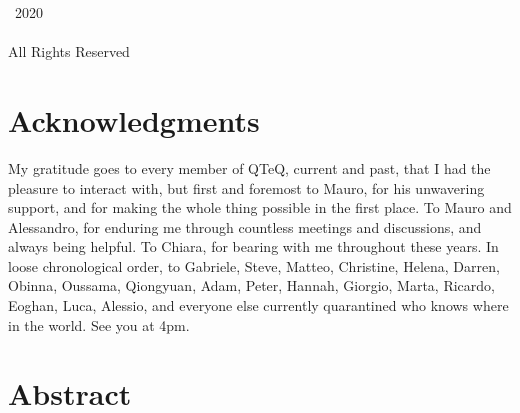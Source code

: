 
\pagestyle{plain}
\setcounter{page}{2}

\begingroup
\centering
{}
\null
\vfill
{\sffamily\textcopyright}~2020
\\[0.5em]
\AuthorName
\\[0.5em]
All Rights Reserved
\par
\endgroup

\clearpage



\clearpage


\chapter*{Acknowledgments}
My gratitude goes to every member of QTeQ, current and past, that I had the pleasure to interact with, but first and foremost to Mauro, for his unwavering support, and for making the whole thing possible in the first place. To Mauro and Alessandro, for enduring me through countless meetings and discussions, and always being helpful.
To Chiara, for bearing with me throughout these years.
In loose chronological order, to Gabriele, Steve, Matteo, Christine, Helena, Darren, Obinna, Oussama, Qiongyuan, Adam, Peter, Hannah, Giorgio, Marta, Ricardo, Eoghan, Luca, Alessio, and everyone else currently quarantined who knows where in the world.
See you at 4pm.


\clearpage


\chapter*{Abstract}

